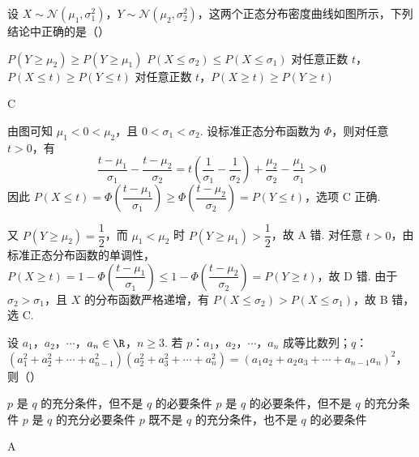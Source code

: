 \begin{problem}
设 \(X\sim\mathcal{N}(\mu_1,\sigma_1^2)\)，\(Y\sim\mathcal{N}(\mu_2,\sigma_2^2)\)，这两个正态分布密度曲线如图所示，下列结论中正确的是（\quad）


\choices
    {\(P(Y\geqslant\mu_2)\geqslant P(Y\geqslant\mu_1)\)}
    {\(P(X\leqslant\sigma_2)\leqslant P(X\leqslant\sigma_1)\)}
    {对任意正数 \(t\)，\(P(X\leqslant t)\geqslant P(Y\leqslant t)\)}
    {对任意正数 \(t\)，\(P(X\geqslant t)\geqslant P(Y\geqslant t)\)}
\end{problem}

\begin{answer}
C
\end{answer}

\begin{solution}
由图可知 \(\mu_1<0<\mu_2\)，且 \(0<\sigma_1<\sigma_2\). 设标准正态分布函数为 \(\Phi\)，则对任意 \(t>0\)，有
\[
\frac{t-\mu_1}{\sigma_1}-\frac{t-\mu_2}{\sigma_2}
=t\left(\frac1{\sigma_1}-\frac1{\sigma_2}\right)+\frac{\mu_2}{\sigma_2}-\frac{\mu_1}{\sigma_1}>0
\]
因此 \(P(X\leqslant t)=\Phi\left(\dfrac{t-\mu_1}{\sigma_1}\right)\geqslant\Phi\left(\dfrac{t-\mu_2}{\sigma_2}\right)=P(Y\leqslant t)\)，选项 C 正确.

又 \(P(Y\geqslant\mu_2)=\dfrac12\)，而 \(\mu_1<\mu_2\) 时 \(P(Y\geqslant\mu_1)>\dfrac12\)，故 A 错. 对任意 \(t>0\)，由标准正态分布函数的单调性，
\(P(X\geqslant t)=1-\Phi\left(\dfrac{t-\mu_1}{\sigma_1}\right)\leqslant1-\Phi\left(\dfrac{t-\mu_2}{\sigma_2}\right)=P(Y\geqslant t)\)，故 D 错. 由于 \(\sigma_2>\sigma_1\)，且 \(X\) 的分布函数严格递增，有 \(P(X\leqslant\sigma_2)>P(X\leqslant\sigma_1)\)，故 B 错，选 C.
\end{solution}

\begin{problem}
设 \(a_1\)，\(a_2\)，\(\cdots\)，\(a_n\in\R\)，\(n\geqslant3\). 若 \(p\)：\(a_1\)，\(a_2\)，\(\cdots\)，\(a_n\) 成等比数列；\(q\)：\((a_1^2+a_2^2+\cdots+a_{n-1}^2)(a_2^2+a_3^2+\cdots+a_n^2)=(a_1a_2+a_2a_3+\cdots+a_{n-1}a_n)^2\)，则（\quad）

\choices
    {\(p\) 是 \(q\) 的充分条件，但不是 \(q\) 的必要条件}
    {\(p\) 是 \(q\) 的必要条件，但不是 \(q\) 的充分条件}
    {\(p\) 是 \(q\) 的充分必要条件}
    {\(p\) 既不是 \(q\) 的充分条件，也不是 \(q\) 的必要条件}
\end{problem}

\begin{answer}
A
\end{answer}

